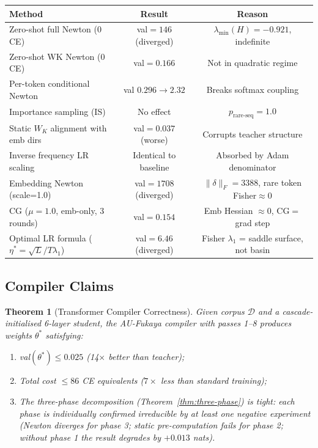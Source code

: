 \documentclass[11pt]{amsart}
\newtheorem{theorem}{Theorem}[section]
\begin{document}
\begin{center}
\small
\begin{tabular}{p{6.0cm}cc}
\toprule
\textbf{Method} & \textbf{Result} & \textbf{Reason} \\
\midrule
Zero-shot full Newton (0 CE) & val$=146$ (diverged) & $\lambda_{\min}(H)=-0.921$, indefinite \\
Zero-shot WK Newton (0 CE) & val$=0.166$ & Not in quadratic regime \\
Per-token conditional Newton & val $0.296{\to}2.32$ & Breaks softmax coupling \\
Importance sampling (IS) & No effect & $p_{\text{rare-seq}}=1.0$ \\
Static $W_K$ alignment with emb dirs & val$=0.037$ (worse) & Corrupts teacher structure \\
Inverse frequency LR scaling & Identical to baseline & Absorbed by Adam denominator \\
Embedding Newton (scale=1.0) & val$=1708$ (diverged) & $\|\delta\|_F=3388$, rare token Fisher$\approx 0$ \\
CG ($\mu{=}1.0$, emb-only, 3 rounds) & val$=0.154$ & Emb Hessian $\approx 0$, CG$=$grad step \\
Optimal LR formula ($\eta^*=\sqrt{L}/T\lambda_1$) & val$=6.46$ (diverged) & Fisher $\lambda_1$ = saddle surface, not basin \\
\bottomrule
\end{tabular}
\end{center}

\subsection{Compiler Claims}

\begin{theorem}[Transformer Compiler Correctness]
Given corpus $\mathcal{D}$ and a cascade-initialised 6-layer student,
the AU-Fukaya compiler with passes 1--8 produces weights $\theta^*$
satisfying:
\begin{enumerate}
\item val$(\theta^*) \leq 0.025$ (14$\times$ better than teacher);
\item Total cost $\leq 86$ CE equivalents ($7\times$ less than standard training);
\item The three-phase decomposition (Theorem~\ref{thm:three-phase})
  is tight: each phase is individually confirmed irreducible by
  at least one negative experiment (Newton diverges for phase 3;
  static pre-computation fails for phase 2;
  without phase 1 the result degrades by $+0.013$ nats).
\end{enumerate}
\end{theorem}
\end{document}
